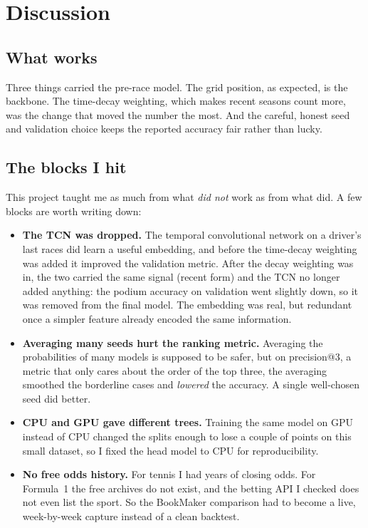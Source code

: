 \documentclass[10pt,twocolumn]{article}
\begin{document}
\section{Discussion}

\subsection{What works}
Three things carried the pre-race model. The grid position, as expected, is the
backbone. The time-decay weighting, which makes recent seasons count more, was
the change that moved the number the most. And the careful, honest seed and
validation choice keeps the reported accuracy fair rather than lucky.

\subsection{The blocks I hit}
This project taught me as much from what \emph{did not} work as from what did.
A few blocks are worth writing down:

\begin{itemize}[leftmargin=1.2em,itemsep=2pt]
  \item \textbf{The TCN was dropped.} The temporal convolutional network on a
        driver's last races did learn a useful embedding, and before the
        time-decay weighting was added it improved the validation metric. After
        the decay weighting was in, the two carried the same signal (recent
        form) and the TCN no longer added anything: the podium accuracy on
        validation went slightly down, so it was removed from the final model.
        The embedding was real, but redundant once a simpler feature already
        encoded the same information.
  \item \textbf{Averaging many seeds hurt the ranking metric.} Averaging the
        probabilities of many models is supposed to be safer, but on
        precision@3, a metric that only cares about the order of the top three,
        the averaging smoothed the borderline cases and \emph{lowered} the
        accuracy. A single well-chosen seed did better.
  \item \textbf{CPU and GPU gave different trees.} Training the same model on
        GPU instead of CPU changed the splits enough to lose a couple of points
        on this small dataset, so I fixed the head model to CPU for
        reproducibility.
  \item \textbf{No free odds history.} For tennis I had years of closing odds.
        For Formula~1 the free archives do not exist, and the betting API I
        checked does not even list the sport. So the BookMaker comparison had to
        become a live, week-by-week capture instead of a clean backtest.
\end{itemize}
\end{document}
